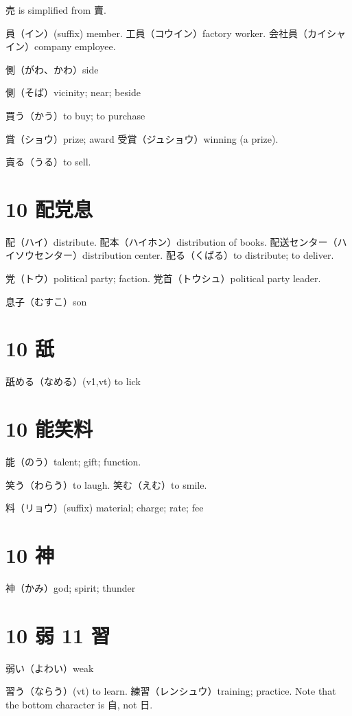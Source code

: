 売 is simplified from 賣.

員（イン）(suffix) member.
工員（コウイン）factory worker.
会社員（カイシャイン）company employee.

側（がわ、かわ）side

側（そば）vicinity; near; beside

買う（かう）to buy; to purchase

賞（ショウ）prize; award
受賞（ジュショウ）winning (a prize).

賣る（うる）to sell.

\section{10 配党息}

配（ハイ）distribute.
配本（ハイホン）distribution of books.
配送センター（ハイソウセンター）distribution center.
配る（くばる）to distribute; to deliver.

党（トウ）political party; faction.
党首（トウシュ）political party leader.

息子（むすこ）son

\section{10 舐}

舐める（なめる）(v1,vt) to lick

\section{10 能笑料}

能（のう）talent; gift; function.

笑う（わらう）to laugh.
笑む（えむ）to smile.

料（リョウ）(suffix) material; charge; rate; fee

\section{10 神}

神（かみ）god; spirit; thunder

\section{10 弱 11 習}

弱い（よわい）weak

習う（ならう）(vt) to learn.
練習（レンシュウ）training; practice.
Note that the bottom character is 自, not 日.

